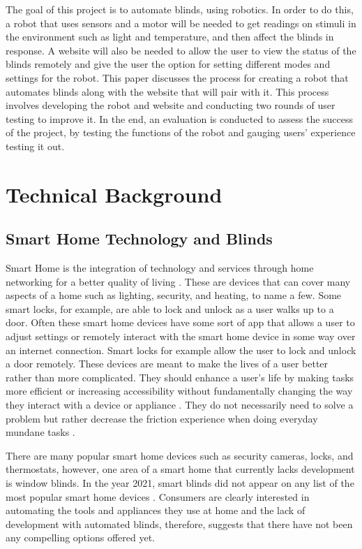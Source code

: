 \documentclass[10pt,twocolumn]{article}
\begin{document}
The goal of this project is to automate blinds, using robotics. In order to do this, a robot that uses sensors and a motor will be needed to get readings on stimuli in the environment such as light and temperature, and then affect the blinds in response. A website will also be needed to allow the user to view the status of the blinds remotely and give the user the option for setting different modes and settings for the robot. This paper discusses the process for creating a robot that automates blinds along with the website that will pair with it. This process involves developing the robot and website and conducting two rounds of user testing to improve it. In the end, an evaluation is conducted to assess the success of the project, by testing the functions of the robot and gauging users’ experience testing it out.


\section{Technical Background}
\subsection{Smart Home Technology and Blinds}
Smart Home is the integration of technology and services through home networking for a better quality of living \cite{Hayes2022SmartHome}. These are devices that can cover many aspects of a home such as lighting, security, and heating, to name a few. Some smart locks, for example, are able to lock and unlock as a user walks up to a door. Often these smart home devices have some sort of app that allows a user to adjust settings or remotely interact with the smart home device in some way over an internet connection. Smart locks for example allow the user to lock and unlock a door remotely. These devices are meant to make the lives of a user better rather than more complicated. They should enhance a user’s life by making tasks more efficient or increasing accessibility without fundamentally changing the way they interact with a device or appliance \cite{Tamayo2022SmartHome}. They do not necessarily need to solve a problem but rather decrease the friction experience when doing everyday mundane tasks \cite{Tamayo2022SmartHome}.

There are many popular smart home devices such as security cameras, locks, and thermostats, however, one area of a smart home that currently lacks development is window blinds. In the year 2021, smart blinds did not appear on any list of the most popular smart home devices \cite{Woodall2021Popular}. Consumers are clearly interested in automating the tools and appliances they use at home and the lack of development with automated blinds, therefore, suggests that there have not been any compelling options offered yet.
\end{document}
